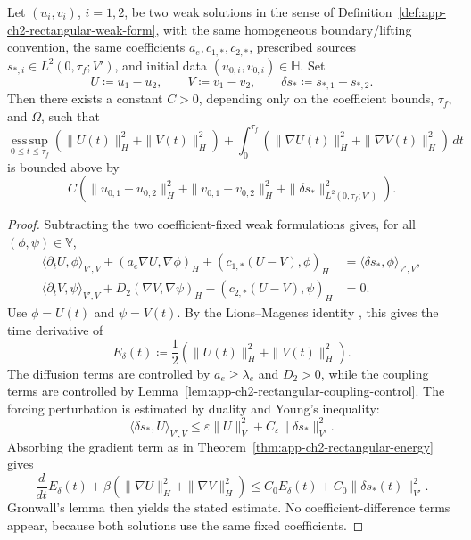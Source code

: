 \begin{proposition}
    \label{prop:app-ch2-rectangular-continuous-dependence}
    Let \((u_i,v_i)\), \(i=1,2\), be two weak solutions in the sense of Definition~\ref{def:app-ch2-rectangular-weak-form}, with the same homogeneous boundary/lifting convention, the same coefficients \(a_e,c_{1,*},c_{2,*}\), prescribed sources \(s_{*,i}\in L^2(0,\tau_f;V')\), and initial data \((u_{0,i},v_{0,i})\in\mathbb{H}\). Set
    \[
        U\coloneqq u_1-u_2,
        \qquad
        V\coloneqq v_1-v_2,
        \qquad
        \delta s_*\coloneqq s_{*,1}-s_{*,2}.
    \]
    Then there exists a constant \(C>0\), depending only on the coefficient bounds, \(\tau_f\), and \(\Omega\), such that
    \[
        \operatorname*{ess\,sup}_{0\le t\le\tau_f}
        \left(
        \|U(t)\|_H^2
        +
        \|V(t)\|_H^2
        \right)
        +
        \int_0^{\tau_f}
        \left(
        \|\nabla U(t)\|_H^2
        +
        \|\nabla V(t)\|_H^2
        \right)\,dt
    \]
    is bounded above by
    \[
        C
        \left(
        \|u_{0,1}-u_{0,2}\|_H^2
        +
        \|v_{0,1}-v_{0,2}\|_H^2
        +
        \|\delta s_*\|_{L^2(0,\tau_f;V')}^2
        \right).
    \]
\end{proposition}
\begin{proof}
    Subtracting the two coefficient-fixed weak formulations gives, for all \((\phi,\psi)\in\mathbb{V}\),
    \begin{align*}
        \langle\partial_tU,\phi\rangle_{V',V}
        +
        (a_e\nabla U,\nabla\phi)_H
        +
        (c_{1,*}(U-V),\phi)_H
         & =
        \langle\delta s_*,\phi\rangle_{V',V},
        \\
        \langle\partial_tV,\psi\rangle_{V',V}
        +
        D_2(\nabla V,\nabla\psi)_H
        -
        (c_{2,*}(U-V),\psi)_H
         & =
        0.
    \end{align*}
    Use \(\phi=U(t)\) and \(\psi=V(t)\). By the Lions--Magenes identity \cite[Lemma~1.2]{Temam_1984}, this gives the time derivative of
    \[
        E_{\delta}(t)
        \coloneqq
        \frac{1}{2}
        \left(
        \|U(t)\|_H^2+\|V(t)\|_H^2
        \right).
    \]
    The diffusion terms are controlled by \(a_e\ge\lambda_e\) and \(D_2>0\), while the coupling terms are controlled by Lemma~\ref{lem:app-ch2-rectangular-coupling-control}. The forcing perturbation is estimated by duality and Young's inequality:
    \[
        \langle\delta s_*,U\rangle_{V',V}
        \le
        \varepsilon\|U\|_V^2
        +
        C_{\varepsilon}\|\delta s_*\|_{V'}^2.
    \]
    Absorbing the gradient term as in Theorem~\ref{thm:app-ch2-rectangular-energy} gives
    \[
        \frac{d}{dt}E_{\delta}(t)
        +
        \beta
        \left(
        \|\nabla U\|_H^2+\|\nabla V\|_H^2
        \right)
        \le
        C_0E_{\delta}(t)
        +
        C_0\|\delta s_*(t)\|_{V'}^2.
    \]
    Gronwall's lemma \cite[pp.~292--296]{Gronwall_1919} then yields the stated estimate. No coefficient-difference terms appear, because both solutions use the same fixed coefficients.
\end{proof}

